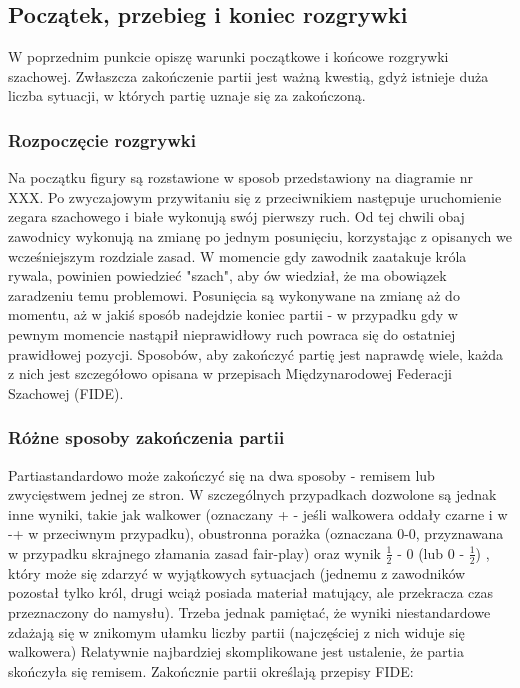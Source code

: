 \documentclass[12pt,leqno]{article}
\begin{document}
\subsection{Początek, przebieg i koniec rozgrywki}
W poprzednim punkcie opiszę warunki początkowe i końcowe rozgrywki szachowej. Zwłaszcza zakończenie partii jest ważną kwestią, gdyż istnieje duża liczba sytuacji, w których partię uznaje się za zakończoną. 
\subsubsection{Rozpoczęcie rozgrywki}
Na początku figury są rozstawione w sposob przedstawiony na diagramie nr XXX. Po zwyczajowym przywitaniu się z przeciwnikiem następuje uruchomienie zegara szachowego i białe wykonują swój pierwszy ruch. Od tej chwili obaj zawodnicy wykonują na zmianę po jednym posunięciu, korzystając z opisanych we wcześniejszym rozdziale zasad. W momencie gdy zawodnik zaatakuje króla rywala, powinien powiedzieć "szach", aby ów wiedział, że ma obowiązek zaradzeniu temu problemowi. Posunięcia są wykonywane na zmianę aż do momentu, aż w jakiś sposób nadejdzie koniec partii - w przypadku gdy w pewnym momencie nastąpił nieprawidłowy ruch powraca się do ostatniej prawidłowej pozycji. Sposobów, aby zakończyć partię jest naprawdę wiele, każda z nich jest szczegółowo opisana w przepisach Międzynarodowej Federacji Szachowej (FIDE).

\subsubsection{Różne sposoby zakończenia partii}
Partiastandardowo może zakończyć się na dwa sposoby - remisem lub zwycięstwem jednej ze stron. W szczególnych przypadkach dozwolone są jednak inne wyniki, takie jak walkower (oznaczany + - jeśli walkowera oddały czarne i w -+ w przeciwnym przypadku), obustronna porażka (oznaczana 0-0, przyznawana w przypadku skrajnego złamania zasad fair-play) oraz wynik $\frac{1}{2}$ - 0 (lub 0 - $\frac{1}{2}$) , który może się zdarzyć w wyjątkowych sytuacjach (jednemu z zawodników pozostał tylko król, drugi wciąż posiada materiał matujący, ale przekracza czas przeznaczony do namysłu). Trzeba jednak pamiętać, że wyniki niestandardowe zdażają się w znikomym ułamku liczby partii (najczęściej z nich widuje się walkowera) 
Relatywnie najbardziej skomplikowane jest ustalenie, że partia skończyła się remisem. Zakończnie partii określają przepisy FIDE: \\\\
\end{document}
